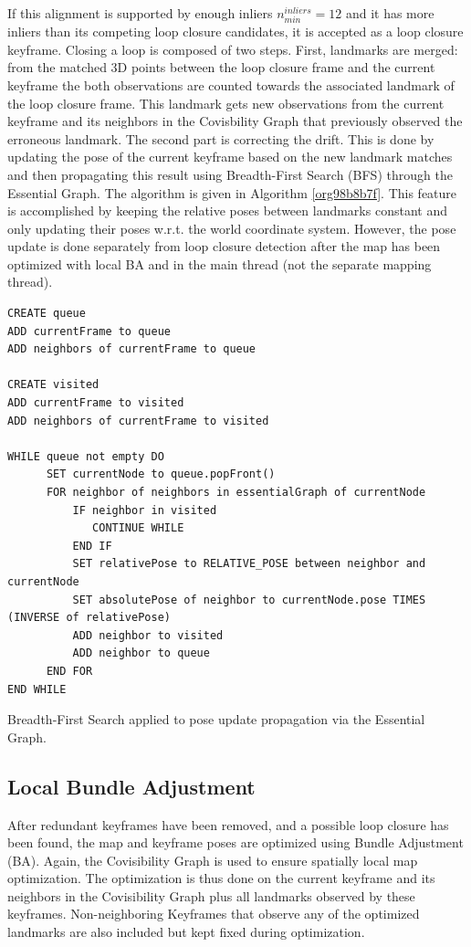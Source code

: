 \documentclass[a4paper, 10pt]{article}
\begin{document}
If this alignment is supported by enough inliers \(n_{min}^{inliers}=12\) and it has more inliers than its competing loop closure candidates, it is accepted as a loop closure keyframe.
Closing a loop is composed of two steps. First, landmarks are merged: from the matched 3D points between the loop closure frame and the current keyframe the both observations are 
counted towards the associated landmark of the loop closure frame. This landmark gets new observations from the current keyframe and its neighbors in the Covisbility Graph that previously observed the erroneous landmark. 
The second part is correcting the drift. This is done by updating the pose of the current keyframe based on the new landmark matches and then propagating this result using Breadth-First Search (BFS) \cite{bfs} through the Essential Graph. 
The algorithm is given in Algorithm \ref{org98b8b7f}. This feature is accomplished by keeping the relative poses between landmarks constant and only updating their poses w.r.t. the world coordinate system.
However, the pose update is done separately from loop closure detection after the map has been optimized with local BA and in the main thread (not the separate mapping thread).

\begin{listing}
\begin{verbatim}
CREATE queue
ADD currentFrame to queue
ADD neighbors of currentFrame to queue

CREATE visited
ADD currentFrame to visited
ADD neighbors of currentFrame to visited

WHILE queue not empty DO
      SET currentNode to queue.popFront()
      FOR neighbor of neighbors in essentialGraph of currentNode
          IF neighbor in visited
             CONTINUE WHILE
          END IF
          SET relativePose to RELATIVE_POSE between neighbor and currentNode
          SET absolutePose of neighbor to currentNode.pose TIMES (INVERSE of relativePose)
          ADD neighbor to visited
          ADD neighbor to queue
      END FOR
END WHILE

\end{verbatim}
\caption{\label{org98b8b7f}
Breadth-First Search applied to pose update propagation via the Essential Graph.}
\end{listing}

\subsection{Local Bundle Adjustment}
\label{sec:org8c5fb1c}
After redundant keyframes have been removed, and a possible loop closure has been found, the map and keyframe poses are optimized using Bundle Adjustment (BA). Again, the Covisibility Graph is used to ensure spatially local map optimization. 
The optimization is thus done on the current keyframe and its neighbors in the Covisibility Graph plus all landmarks observed by these keyframes.
Non-neighboring Keyframes that observe any of the optimized landmarks are also included but kept fixed during optimization.
\end{document}
